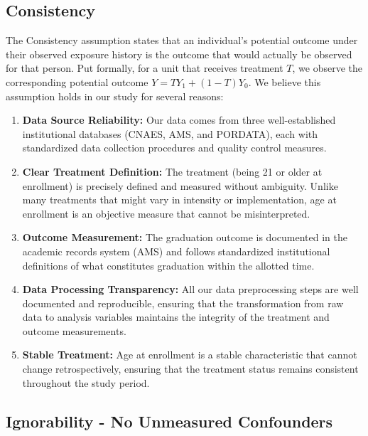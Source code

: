 \documentclass{article}
\begin{document}
\subsection{Consistency}

The Consistency assumption states that an individual's potential outcome under their observed exposure history is the outcome that would actually be observed for that person. Put formally, for a unit that receives treatment $T$, we observe the corresponding potential outcome $Y = TY_1 + (1-T)Y_0$. We believe this assumption holds in our study for several reasons:

\begin{enumerate}
    \item \textbf{Data Source Reliability:} Our data comes from three well-established institutional databases (CNAES, AMS, and PORDATA), each with standardized data collection procedures and quality control measures.
    
    \item \textbf{Clear Treatment Definition:} The treatment (being 21 or older at enrollment) is precisely defined and measured without ambiguity. Unlike many treatments that might vary in intensity or implementation, age at enrollment is an objective measure that cannot be misinterpreted.
    
    \item \textbf{Outcome Measurement:} The graduation outcome is documented in the academic records system (AMS) and follows standardized institutional definitions of what constitutes graduation within the allotted time.
    
    \item \textbf{Data Processing Transparency:} All our data preprocessing steps are well documented and reproducible, ensuring that the transformation from raw data to analysis variables maintains the integrity of the treatment and outcome measurements.
    
    \item \textbf{Stable Treatment:} Age at enrollment is a stable characteristic that cannot change retrospectively, ensuring that the treatment status remains consistent throughout the study period.
\end{enumerate}

\subsection{Ignorability - No Unmeasured Confounders}
\end{document}
